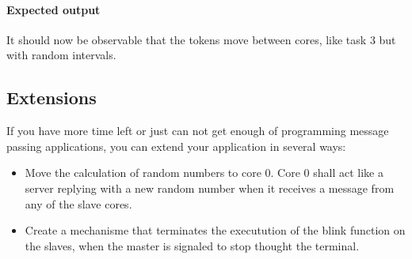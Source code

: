 \documentclass[a4paper,fontsize=10pt,twoside,DIV15,BCOR12mm,headinclude=true,footinclude=false,pagesize,bibtotoc]{scrbook}
\newcommand{\nopublish}[1]{}
\begin{document}
\paragraph*{Expected output}
It should now be observable that the tokens move between cores, like task 3 but with random intervals.

\subsection{Extensions}
If you have more time left or just can not get enough of programming message passing applications, you can extend your application  in several ways:
\begin{itemize}
\item Move the calculation of random numbers to core 0.
Core 0 shall act like a server replying with a new random number when it receives a message from any of the slave cores.
\item Create a mechanisme that terminates the executution of the blink function on the slaves, when the master is signaled to stop thought the terminal. 
\end{itemize}

\nopublish{

\section{Circulating tokens - WCET}

This exercise will show how to calculate the maximum worst case throughput of tokens.
The exercise comprise the following tasks:
\begin{itemize}
\item Compile with platin
\item 
\label{list:ex2:num1}\end{itemize}

\section{Next exercise}

Ideas to other exercises:
\begin{itemize}
\item WCET analysis of the circulating tokens
  \begin{itemize}
  \item Worst case throughput of tokens
  \item Worst case latency of a token through two processors
  \end{itemize}
\item Health monitoring 
\item I/O server
\end{itemize}

}
\appendix
\end{document}
